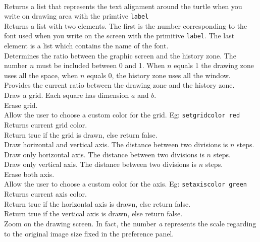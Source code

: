 \hspace{0cm}\\
Returns a list that represents the text alignment around the turtle when you write on drawing area with the primtive \texttt{label}\\
Returns a list with two elements. The first is the number corresponding to the font used when you write on the screen with the primitive \texttt{label}. The last element is a list which contains the name of the font.\\
Determines the ratio between the graphic screen and the history zone. The number $n$ must be included between 0 and 1. When $n$ equals 1 the drawing zone uses all the space, when $n$ equals 0, the history zone uses all the window.\\
Provides the current ratio between the drawing zone and the history zone.\\
Draw a grid. Each square has dimension $a$ and $b$.\\
Erase grid.\\
Allow the user to choose a custom color for the grid. Eg: \texttt{setgridcolor red}\\
Returns current grid color.\\
Return true if the grid is drawn, else return false.\\
Draw horizontal and vertical axis. The distance between two divisions is $n$ steps. \\
Draw only horizontal axis. The distance between two divisions is $n$ steps.\\
Draw only vertical axis. The distance between two divisions is $n$ steps.\\
Erase both axis.\\
Allow the user to choose a custom color for the axis. Eg: \texttt{setaxiscolor green} \\
Returns current axis color.\\
Return true if the horizontal axis is drawn, else return false.\\
Return true if the vertical axis is drawn, else return false.\\
Zoom on the drawing screen. In fact, the number \textit{a} represents the scale regarding to the original image size fixed in the preference panel.\\
